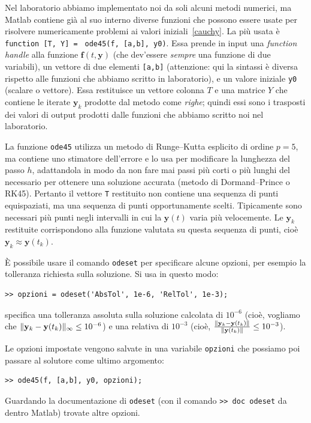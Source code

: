 \documentclass[a4paper]{report}
\DeclarePairedDelimiter{\norm}{\lVert}{\rVert}
\theoremstyle{definition}
\theoremstyle{remark}
\newcommand{\y}{\mathbf{y}}
\newcommand{\f}{\mathbf{f}}
\newcommand{\checkkey}[1]{%
        \ifstrequal{#1}{inf}{\setbool{showcontent}{true}}{}%
    }
\newenvironment{conditional}[1][]{%
        \setbool{showcontent}{false}%
        \forcsvlist\checkkey{#1}%
        \ifbool{showcontent}{\begingroup}{\expandafter\comment}%
    }{%
        \ifbool{showcontent}{\endgroup}{\expandafter\endcomment}%
    }
\newcommand{\checkkey}[1]{%
        \ifstrequal{#1}{ich}{\setbool{showcontent}{true}}{}%
    }
\newenvironment{conditional}[1][]{%
        \setbool{showcontent}{false}%
        \forcsvlist\checkkey{#1}%
        \ifbool{showcontent}{\begingroup}{\expandafter\comment}%
    }{%
        \ifbool{showcontent}{\endgroup}{\expandafter\endcomment}%
    }
\begin{document}
\begin{conditional}[ich]
Nel laboratorio abbiamo implementato noi da soli alcuni metodi numerici, ma Matlab contiene già al suo interno diverse funzioni che possono essere usate per risolvere numericamente problemi ai valori iniziali~\eqref{cauchy}. La più usata è \lstinline{function [T, Y] = } \lstinline{ode45(f, [a,b], y0)}. Essa prende in input una \emph{function handle} alla funzione $\f(t,\y)$ (che dev'essere \emph{sempre} una funzione di due variabili), un vettore di due elementi \lstinline{[a,b]} (attenzione: qui la sintassi è diversa rispetto alle funzioni che abbiamo scritto in laboratorio), e un valore iniziale \lstinline{y0} (scalare o vettore). Essa restituisce un vettore colonna $T$ e una matrice $Y$ che contiene le iterate $\y_k$ prodotte dal metodo come \emph{righe}; quindi essi sono i trasposti dei valori di output prodotti dalle funzioni che abbiamo scritto noi nel laboratorio.

La funzione \lstinline{ode45} utilizza un metodo di Runge--Kutta esplicito di ordine $p=5$, ma contiene uno stimatore dell'errore e lo usa per modificare la lunghezza del passo $h$, adattandola in modo da non fare mai passi più corti o più lunghi del necessario per ottenere una soluzione accurata (metodo di Dormand--Prince o RK45). Pertanto il vettore \lstinline{T} restituito non contiene una sequenza di punti equispaziati, ma una sequenza di punti opportunamente scelti. Tipicamente sono necessari più punti negli intervalli in cui la $\y(t)$ varia più velocemente. Le $\y_k$ restituite corrispondono alla funzione valutata su questa sequenza di punti, cioè $\y_k \approx \y(t_k)$.

È possibile usare il comando \lstinline{odeset} per specificare alcune opzioni, per esempio la tolleranza richiesta sulla soluzione. Si usa in questo modo:
\begin{lstlisting}
>> opzioni = odeset('AbsTol', 1e-6, 'RelTol', 1e-3);
\end{lstlisting}
specifica una tolleranza assoluta sulla soluzione calcolata di $10^{-6}$ (cioè, vogliamo che $\norm{\y_k - \y(t_k)}_\infty \leq 10^{-6}$) e una relativa di $10^{-3}$ (cioè, $\frac{\norm{\y_k - \y(t_k)}}{\norm{\y(t_k)}} \leq 10^{-3}$).

Le opzioni impostate vengono salvate in una variabile \lstinline{opzioni} che possiamo poi passare al solutore come ultimo argomento:
\begin{lstlisting}
>> ode45(f, [a,b], y0, opzioni);
\end{lstlisting}
Guardando la documentazione di \lstinline{odeset} (con il comando \lstinline{>> doc odeset} da dentro Matlab) trovate altre opzioni.


\end{conditional}
\end{document}
